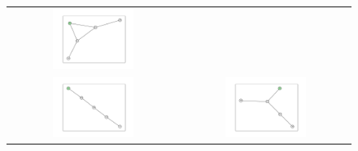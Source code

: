\documentclass[12pt, a4paper]{extarticle}
\begin{document}
\begin{figure}
\begin{tabularx}{\textwidth}{cc}
\includegraphics[width=0.5\textwidth]{task11-graphlets/5_14-21-25-23-26.pdf} \\
\includegraphics[width=0.5\textwidth]{task11-graphlets/5_10-8-16-18-23.pdf} &
\includegraphics[width=0.5\textwidth]{task11-graphlets/5_14-16-21-20-23.pdf} \\
\end{tabularx}\end{figure}
\end{document}
